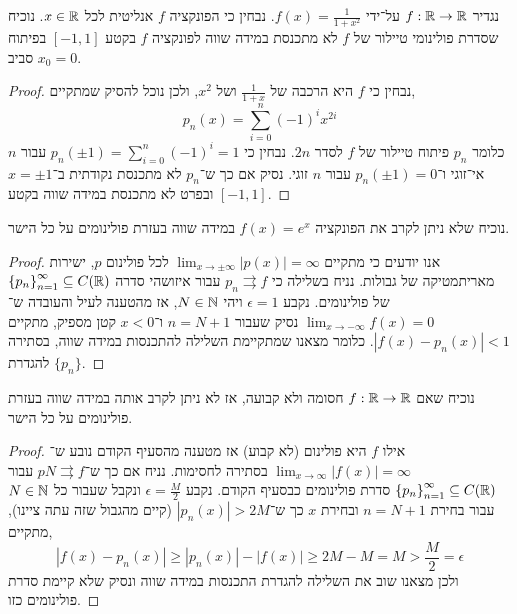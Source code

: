 \subquestion{}
נגדיר $f : \mathbb{R} \to \mathbb{R}$ על־ידי $f(x) = \frac{1}{1 + x^2}$.
נבחין כי הפונקציה $f$ אנליטית לכל $x \in \mathbb{R}$.
נוכיח שסדרת פולינומי טיילור של $f$ לא מתכנסת במידה שווה לפונקציה $f$ בקטע $[-1, 1]$ בפיתוח סביב $x_0 = 0$.
\begin{proof}
	נבחין כי $f$ היא הרכבה של $\frac{1}{1 + x}$ ושל $x^2$, ולכן נוכל להסיק שמתקיים,
	\[
		p_n(x) = \sum_{i = 0}^n {(-1)}^i x^{2i}
	\]
	כלומר $p_n$ פיתוח טיילור של $f$ לסדר $2n$.
	נבחין כי $p_n(\pm 1) = \sum_{i = 0}^n {(-1)}^i = 1$ עבור $n$ אי־זוגי ו־$p_n(\pm 1) = 0$ עבור $n$ זוגי.
	נסיק אם כך ש־$p_n$ לא מתכנסת נקודתית ב־$x = \pm 1$ ובפרט לא מתכנסת במידה שווה בקטע $[-1, 1]$.
\end{proof}

\subquestion{}
נוכיח שלא ניתן לקרב את הפונקציה $f(x) = e^x$ במידה שווה בעזרת פולינומים על כל הישר.
\begin{proof}
	אנו יודעים כי מתקיים $\lim_{x \to \pm \infty} |p(x)| = \infty$ לכל פולינום $p$, ישירות מאריתמטיקה של גבולות.
	נניח בשלילה כי $p_n \rightrightarrows f$ עבור איזושהי סדרה ${\{ p_n \}}_{n = 1}^\infty \subseteq C(\mathbb{R})$ של פולינומים.
	נקבע $\epsilon = 1$ ויהי $N \in \mathbb{N}$, אז מהטענה לעיל והעובדה ש־$\lim_{x \to -\infty} f(x) = 0$ נסיק שעבור $n = N + 1$ ו־$x < 0$ קטן מספיק, מתקיים $|f(x) - p_n(x)| < 1$.
	כלומר מצאנו שמתקיימת השלילה להתכנסות במידה שווה, בסתירה להגדרת $\{ p_n \}$.
\end{proof}

\subquestion{}
נוכיח שאם $f : \mathbb{R} \to \mathbb{R}$ חסומה ולא קבועה,
אז לא ניתן לקרב אותה במידה שווה בעזרת פולינומים על כל הישר.
\begin{proof}
	אילו $f$ היא פולינום (לא קבוע) אז מטענה מהסעיף הקודם נובע ש־$\lim_{x \to \infty} |f(x)| = \infty$ בסתירה לחסימות.
	נניח אם כך ש־$pN \rightrightarrows f$ עבור ${\{ p_n \}}_{n = 1}^\infty \subseteq C(\mathbb{R})$ סדרת פולינומים כבסעיף הקודם.
	נקבע $\epsilon = \frac{M}{2}$ ונקבל שעבור כל $N \in \mathbb{N}$ עבור בחירת $n = N + 1$ ובחירת $x$ כך ש־$|p_n(x)| > 2M$ (קיים מהגבול שזה עתה ציינו), מתקיים,
	\[
		|f(x) - p_n(x)| \ge |p_n(x)| - |f(x)| \ge 2M - M = M > \frac{M}{2} = \epsilon
	\]
	ולכן מצאנו שוב את השלילה להגדרת התכנסות במידה שווה ונסיק שלא קיימת סדרת פולינומים כזו.
\end{proof}


